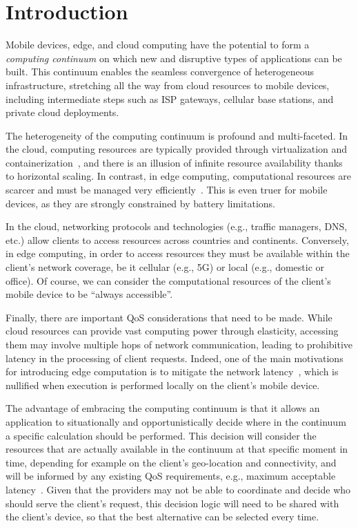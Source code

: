 \section{Introduction}
\label{sec:intro}

Mobile devices, edge, and cloud computing have the potential to form a \textit{computing continuum} on which new and disruptive types of applications can be built. This continuum enables the seamless convergence of heterogeneous infrastructure, stretching all the way from cloud resources to mobile devices, including intermediate steps such as ISP gateways, cellular base stations, and private cloud deployments.

The heterogeneity of the computing continuum is profound and multi-faceted. In the cloud, computing resources are typically provided through virtualization and containerization~\cite{leitner2016patterns, Quatrocchi2016discrete}, and there is an illusion of infinite resource availability thanks to horizontal scaling. In contrast, in edge computing, computational resources are scarcer and must be managed very efficiently~\cite{Dehos14millimeter5g,GarrigaMendonca2017}. This is even truer for mobile devices, as they are strongly constrained by battery limitations. 

In the cloud, networking protocols and technologies (e.g., traffic managers, DNS, etc.) allow clients to access resources across countries and continents. Conversely, in edge computing, in order to access resources they must be available within the client's network coverage, be it cellular (e.g., 5G) or local (e.g., domestic or office). Of course, we can consider the computational resources of the client's mobile device to be ``always accessible''.

Finally, there are important QoS considerations that need to be made. While cloud resources can provide vast computing power through elasticity, accessing them may involve multiple hops of network communication, leading to prohibitive latency in the processing of client requests. Indeed, one of the main motivations for introducing edge computation is to mitigate the network latency~\cite{Shi:2016}, which is nullified when execution is performed locally on the client's mobile device.

The advantage of embracing the computing continuum is that it allows an application to situationally and opportunistically decide where in the continuum a specific calculation should be performed. This decision will consider the resources that are actually available in the continuum at that specific moment in time, depending for example on the client's geo-location and connectivity, and will be informed by any existing QoS requirements, e.g., maximum acceptable latency~\cite{GuptaIfogSim17}. Given that the providers may not be able to coordinate and decide who should serve the client's request, this decision logic will need to be shared with the client's device, so that the best alternative can be selected every time.

